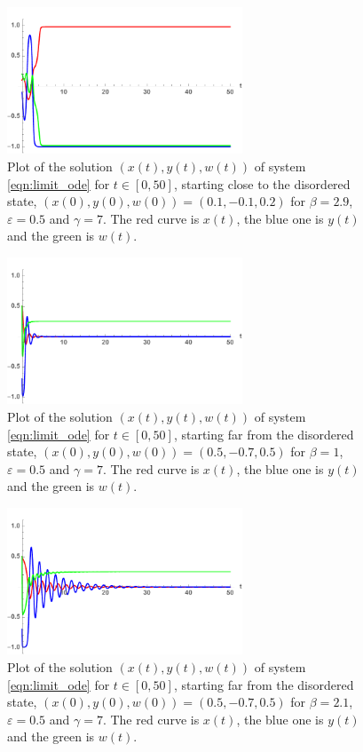\documentclass[a4paper,10pt,leqno]{amsart}
\theoremstyle{plain}
\begin{document}
\begin{figure}   
\centering   
\includegraphics[width=7cm]{ode_1d_b=2_9.pdf}   
\caption{Plot of the solution $(x(t),y(t),w(t))$ of system \eqref{eqn:limit_ode} for $t \in [0,50]$, starting close to the disordered state, $(x(0),y(0),w(0)) = (0.1,-0.1,0.2)$ for $\beta = 2.9$, $\varepsilon = 0.5$ and $\gamma = 7$. The red curve is $x(t)$, the blue one is $y(t)$ and the green is $w(t)$.}   
\label{grafico_sol_b=2.9}   
\end{figure}   

\begin{figure}   
\centering   
\includegraphics[width=7cm]{ode_1d_b=1_lontano.pdf}   
\caption{Plot of the solution $(x(t),y(t),w(t))$ of system \eqref{eqn:limit_ode} for $t \in [0,50]$, starting far from the disordered state, $(x(0),y(0),w(0)) = (0.5,-0.7,0.5)$ for $\beta = 1$, $\varepsilon = 0.5$ and $\gamma = 7$. The red curve is $x(t)$, the blue one is $y(t)$ and the green is $w(t)$.}   
\label{grafico_sol_b=1_lon}   
\end{figure}   

\begin{figure}   
\centering   
\includegraphics[width=7cm]{ode_1d_b=2_1_lontano.pdf}   
\caption{Plot of the solution $(x(t),y(t),w(t))$ of system \eqref{eqn:limit_ode} for $t \in [0,50]$, starting far from the disordered state, $(x(0),y(0),w(0)) = (0.5,-0.7,0.5)$ for $\beta = 2.1$, $\varepsilon = 0.5$ and $\gamma = 7$. The red curve is $x(t)$, the blue one is $y(t)$ and the green is $w(t)$.}   
\label{grafico_sol_b=2.1_lon}   
\end{figure}   
\end{document}
